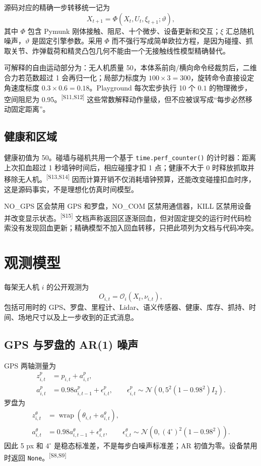 \documentclass[UTF8,11pt]{ctexart}
\newcommand{\src}[1]{\textsuperscript{\textcolor{blue!65!black}{[#1]}}}
\newcommand{\wrap}{\operatorname{wrap}}
\begin{document}
源码对应的精确一步转移统一记为
\begin{equation}
X_{t+1}=\Phi(X_t,U_t,\xi_{t+1};\vartheta),
\label{eq:transition}
\end{equation}
其中 $\Phi$ 包含 Pymunk 刚体接触、阻尼、十个微步、设备更新和交互；$\xi$ 汇总随机噪声，$\vartheta$ 是固定引擎参数。采用 $\Phi$ 而不强行写成简单欧拉方程，是因为碰撞、抓取关节、炸弹载荷和精灵凸包几何不能由一个无接触线性模型精确替代。

可解释的自由运动部分为：无人机质量 50，本体系前向/横向命令经裁剪后，二维合力若范数超过 1 会再归一化；局部力标度为 $100\times3=300$，旋转命令直接设定角速度标度 $0.3\times0.6=0.18$。Playground 每次宏步执行 10 个 $0.1$ 的物理微步，空间阻尼为 0.95。\src{S11,S12} 这些常数解释动作量级，但不应被误写成“每步必然移动固定距离”。

\subsection{健康和区域}

健康初值为 50。碰墙与碰机共用一个基于 \texttt{time.perf\_counter()} 的计时器：距离上次扣血超过 1 秒墙钟时间后，相应碰撞才扣 1 点；健康不大于 0 时释放抓取并移除无人机。\src{S13,S14} 因而计算开销不仅消耗墙钟预算，还能改变碰撞扣血时序，这是源码事实，不是理想化仿真时间模型。

NO\_GPS 区会禁用 GPS 和罗盘，NO\_COM 区禁用通信器，KILL 区禁用设备并改变显示状态。\src{S15} 文档声称返回区逐渐回血，但对固定提交的运行时代码检索没有发现回血更新；精确模型不加入回血转移，只把此项列为文档与代码冲突。

\section{观测模型}

每架无人机 $i$ 的公开观测为
\begin{equation}
O_{i,t}=\mathcal O_i(X_t,\nu_{i,t}),
\end{equation}
包括可用时的 GPS、罗盘、里程计、Lidar、语义传感器、健康、库存、抓持、时间、场地尺寸以及上一步收到的正式消息。

\subsection{GPS 与罗盘的 AR(1) 噪声}

GPS 两轴测量为
\begin{align}
z^p_{i,t}&=p_{i,t}+a^p_{i,t},\\
a^p_{i,t}&=0.98a^p_{i,t-1}+\epsilon^p_{i,t},\qquad
\epsilon^p_{i,t}\sim\mathcal N\!\left(0,5^2(1-0.98^2)I_2\right).
\end{align}
罗盘为
\begin{align}
z^\theta_{i,t}&=\wrap(\theta_{i,t}+a^\theta_{i,t}),\\
a^\theta_{i,t}&=0.98a^\theta_{i,t-1}+\epsilon^\theta_{i,t},\qquad
\epsilon^\theta_{i,t}\sim\mathcal N\!\left(0,(4^\circ)^2(1-0.98^2)\right).
\end{align}
因此 5 px 和 $4^\circ$ 是稳态标准差，不是每步白噪声标准差；AR 初值为零。设备禁用时返回 \texttt{None}。\src{S8,S9}
\end{document}
